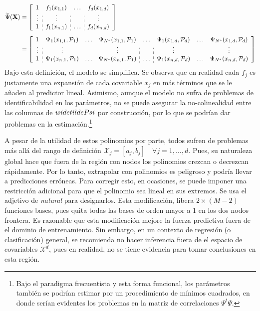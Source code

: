 \documentclass[../Main/Main.tex]{subfiles}
\begin{document}
\begin{align}
\widetilde{\Psi}(\xmat) &= 
\left[
\begin{array}{c:c:c:c}
1 & f_1(x_{1,1}) & \ldots & f_d(x_{1,d}) \\
\vdots & \vdots & ~ & \vdots \\
1 & f_1(x_{n,1}) & \ldots & f_d(x_{n,d}) 
\end{array} 
\right] \label{ec:PsiTilde}\\[5pt]
&=
\left[
\begin{array}{c:ccc:c:ccc}
1 & \Psi_1(x_{1,1},\P_1) & \ldots & \Psi_{\N}(x_{1,1},\P_1) & \ldots & \Psi_1(x_{1,d},\P_d) & \ldots & \Psi_{\N}(x_{1,d},\P_d)\\
\vdots & \vdots & ~ & \vdots & ~ & \vdots & ~ & \vdots \\
1 & \Psi_1(x_{n,1},\P_1) & \ldots & \Psi_{\N}(x_{n,1},\P_1) & \ldots & \Psi_1(x_{n,d},\P_d) & \ldots & \Psi_{\N}(x_{n,d},\P_d)
\end{array}
\right]\nonumber
\end{align}
Bajo esta definición, el modelo se simplifica. Se observa que en realidad cada $f_j$ es justamente una expansión de cada covariable $x_j$ en más términos que se le añaden al predictor lineal. Asimismo, aunque el modelo no sufra de problemas de identificabilidad en los parámetros, no se puede asegurar la no-colinealidad entre las columnas de $\\widetilde{Psi}$ por construcción, por lo que se podrían dar problemas en la estimación.\footnote{Bajo el paradigma frecuentista y esta forma funcional, los parámetros también se podrían estimar por un procedimiento de mínimos cuadrados, en donde serían evidentes los problemas en la matriz de correlaciones $\Psi^t\Psi$.}

A pesar de la utilidad de estos polinomios por parte, todos sufren de problemas más allá del rango de definición $\mathcal{X}_j = [a_j,b_j] \quad \forall j = 1,\ldots,d$. Pues, su naturaleza global hace que fuera de la región con nodos los polinomios crezcan o decrezcan rápidamente. Por lo tanto, extrapolar con polinomios es peligroso y podría llevar a predicciones erróneas. Para corregir esto, en ocasiones, se puede imponer una restricción adicional para que el polinomio sea lineal en sus extremos. Se usa el adjetivo de \textit{natural} para designarlos. Esta modificación, libera $2\times(M-2)$ funciones bases, pues quita todas las bases de orden mayor a 1 en los dos nodos frontera. Es razonable que esta modificación mejore la fuerza predictiva fuera de el dominio de entrenamiento. Sin embargo, en un contexto de regresión (o clasificación) general, se recomienda no hacer inferencia fuera de el espacio de covariables $\mathcal{X}^d$, pues en realidad, no se tiene evidencia para tomar conclusiones en esta región.
\end{document}
